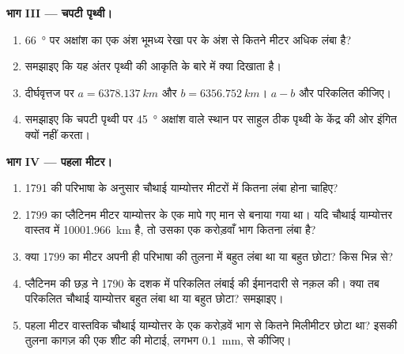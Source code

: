 \begin{problem}
\medskip
\noindent\textbf{भाग III --- चपटी पृथ्वी।}
\begin{enumerate}[resume]
  \item \qty{66}{\degree} पर अक्षांश का एक अंश भूमध्य रेखा पर के अंश से कितने मीटर
        अधिक लंबा है?
  \item समझाइए कि यह अंतर पृथ्वी की आकृति के बारे में क्या दिखाता है।
  \item दीर्घवृत्तज पर $a = \qty{6378.137}{km}$ और
        $b = \qty{6356.752}{km}$। $a - b$ और  परिकलित कीजिए।
  \item समझाइए कि चपटी पृथ्वी पर \qty{45}{\degree} अक्षांश वाले स्थान पर साहुल ठीक
        पृथ्वी के केंद्र की ओर इंगित क्यों नहीं करता।
\end{enumerate}

\medskip
\noindent\textbf{भाग IV --- पहला मीटर।}
\begin{enumerate}[resume]
  \item 1791 की परिभाषा के अनुसार चौथाई याम्योत्तर मीटरों में कितना लंबा होना
        चाहिए?
  \item 1799 का प्लैटिनम मीटर याम्योत्तर के एक मापे गए मान से बनाया गया था। यदि
        चौथाई याम्योत्तर वास्तव में \qty{10001.966}{km} है, तो उसका एक करोड़वाँ भाग
        कितना लंबा है?
  \item क्या 1799 का मीटर अपनी ही परिभाषा की तुलना में बहुत लंबा था या बहुत छोटा? किस
        भिन्न से?
  \item प्लैटिनम की छड़ ने 1790 के दशक में परिकलित लंबाई की ईमानदारी से नक़ल की। क्या
        तब परिकलित चौथाई याम्योत्तर बहुत लंबा था या बहुत छोटा? समझाइए।
  \item पहला मीटर वास्तविक चौथाई याम्योत्तर के एक करोड़वें भाग से कितने मिलीमीटर
        छोटा था? इसकी तुलना कागज़ की एक शीट की मोटाई, लगभग \qty{0.1}{mm}, से
        कीजिए।
\end{enumerate}
\end{problem}

